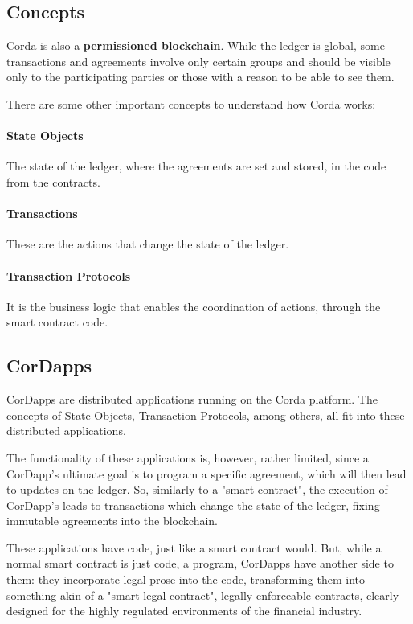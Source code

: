 \subsection{Concepts}
Corda is also a \textbf{permissioned blockchain}. While the ledger is global, some transactions and agreements involve only certain groups and should be visible only to the participating parties or those with a reason to be able to see them. 

There are some other important concepts to understand how Corda works:
\paragraph{State Objects} The state of the ledger, where the agreements are set and stored, in the code from the contracts.
\paragraph{Transactions} These are the actions that change the state of the ledger.
\paragraph{Transaction Protocols} It is the business logic that enables the coordination of actions, through the smart contract code.



\subsection{CorDapps}
CorDapps are distributed applications running on the Corda platform. The concepts of State Objects, Transaction Protocols, among others, all fit into these distributed applications.

The functionality of these applications is, however, rather limited, since a CorDapp's ultimate goal is to program a specific agreement, which will then lead to updates on the ledger. So, similarly to a "smart contract", the execution of CorDapp's leads to transactions which change the state of the ledger, fixing immutable agreements into the blockchain.

These applications have code, just like a smart contract would. But, while a normal smart contract is just code, a program, CorDapps have another side to them: they incorporate legal prose into the code, transforming them into something akin of a "smart legal contract", legally enforceable contracts, clearly designed for the highly regulated environments of the financial industry.


